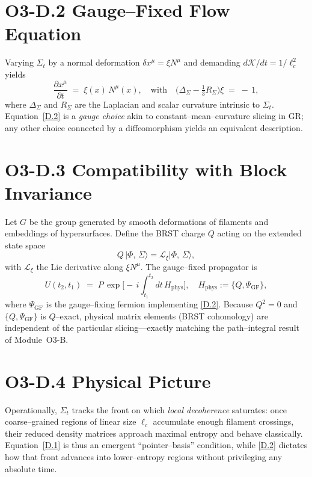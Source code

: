\documentclass[12pt]{article}
\begin{document}
\section*{O3-D.2 \quad Gauge--Fixed Flow Equation}

Varying $\Sigma_t$ by a normal deformation $\delta x^\mu = \xi N^\mu$ and demanding $d\mathcal K/dt = 1/\ell_c^{2}$ yields
\[
  \frac{\partial x^\mu}{\partial t}
  \;=\; \xi(x)\,N^\mu(x),
  \quad\text{with}\quad
  \bigl(\Delta_\Sigma -\tfrac{1}{3}R_\Sigma\bigr)\xi
  \;=\; -\,1,
\tag{D.2}
\]
where $\Delta_\Sigma$ and $R_\Sigma$ are the Laplacian and scalar curvature intrinsic to $\Sigma_t$.  Equation~\eqref{D.2} is a \emph{gauge choice} akin to constant--mean--curvature slicing in GR; any other choice connected by a diffeomorphism yields an equivalent description.

\section*{O3-D.3 \quad Compatibility with Block Invariance}

Let $G$ be the group generated by smooth deformations of filaments and embeddings of hypersurfaces.  
Define the BRST charge $Q$ acting on the extended state space
\[
  Q \,\bigl|\Phi,\,\Sigma\bigr\rangle
  = \mathcal L_\xi \bigl|\Phi,\,\Sigma\bigr\rangle,
\]
with $\mathcal L_\xi$ the Lie derivative along $\xi N^\mu$.  
The gauge--fixed propagator is
\[
  U(t_2,t_1) \;=\;
  P\,\exp\!\bigl[-\,i\!\int_{t_1}^{t_2}\! dt\,H_{\text{phys}}\bigr],
  \quad
  H_{\text{phys}} := \{Q,\Psi_{\text{GF}}\},
\tag{D.3}
\]
where $\Psi_{\text{GF}}$ is the gauge--fixing fermion implementing \eqref{D.2}.  
Because $Q^{2}=0$ and $\{Q,\Psi_{\text{GF}}\}$ is $Q$--exact, physical matrix elements (BRST cohomology) are independent of the particular slicing---exactly matching the path--integral result of Module~O3-B.

\section*{O3-D.4 \quad Physical Picture}

Operationally, $\Sigma_t$ tracks the front on which \emph{local decoherence} saturates: once coarse--grained regions of linear size $\ell_c$ accumulate enough filament crossings, their reduced density matrices approach maximal entropy and behave classically.  
Equation~\eqref{D.1} is thus an emergent ``pointer--basis'' condition, while \eqref{D.2} dictates how that front advances into lower--entropy regions without privileging any absolute time.
\end{document}
